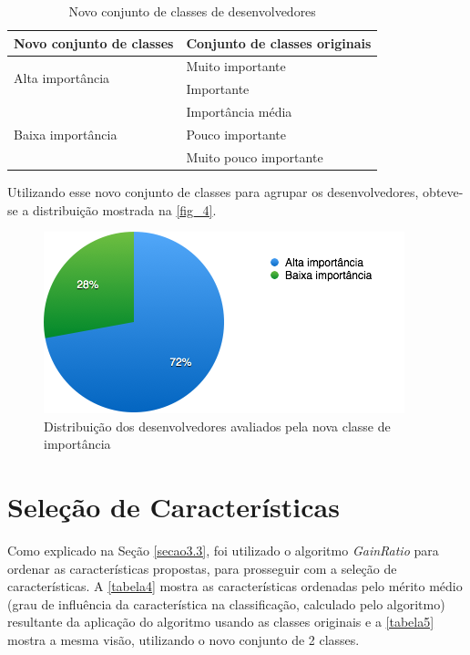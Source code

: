 \begin{table}[h]
	\centering
	\caption{Novo conjunto de classes de desenvolvedores}
	\label{tabela3}
	\def\arraystretch{1.5}
	\begin{tabular}{|p{6cm}|p{8.5cm}|}
		\hline
		\textbf{Novo conjunto de classes}  & \textbf{Conjunto de classes originais} \\ \hline
		\multirow{2}{*}{Alta importância}  & Muito importante                       \\ \cline{2-2} 
		& Importante                             \\ \hline
		\multirow{3}{*}{Baixa importância} & Importância média                      \\ \cline{2-2} 
		& Pouco importante                       \\ \cline{2-2} 
		& Muito pouco importante                 \\ \hline
	\end{tabular}
\end{table}

Utilizando esse novo conjunto de classes para agrupar os desenvolvedores, obteve-se a distribuição mostrada na \autoref{fig_4}.

\begin{figure}[h]
	\centering
	\includegraphics[scale=0.8]{figs/geral/imagem-classe-alternativa.png}
	\caption{\label{fig_4}Distribuição dos desenvolvedores avaliados pela nova classe de importância}
\end{figure}

\section{Seleção de Características}\label{secao4.3}

Como explicado na Seção \ref{secao3.3}, foi utilizado o algoritmo \textit{GainRatio} para ordenar as características propostas, para prosseguir com a seleção de características. A \autoref{tabela4} mostra as características ordenadas pelo mérito médio (grau de influência da característica na classificação, calculado pelo algoritmo) resultante da aplicação do algoritmo usando as classes originais e a \autoref{tabela5} mostra a mesma visão, utilizando o novo conjunto de 2 classes. 

